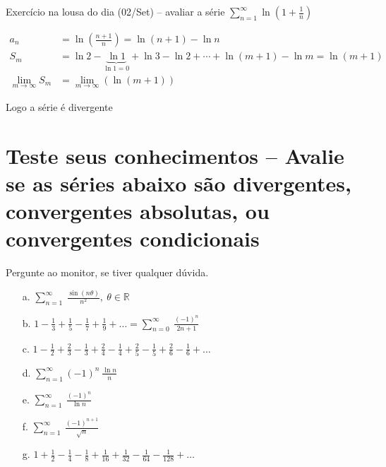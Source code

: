 \documentclass[12pt,openany, letterpaper]{book}
\newcommand{\LI}[1][n]{\lim_{{#1} \rightarrow \infty}}
\newcommand{\soma}[2][n]{\sum_{{#1} = #2}^\infty}
\begin{document}
Exercício na lousa do dia (02/Set) -- avaliar a série $\soma{1} \ln \left( 1 + \frac{1}{n}\right)$

\begin{align*}
a_n &= \ln \left( \frac{n+1}{n} \right) = \ln (n+1) - \ln n \\
S_m &= \ln 2 - \underbrace{\ln 1}_{\ln 1 = 0} + \ln 3 - \ln 2 + \cdots + \ln (m+1) - \ln m = \ln (m+1)\\
\LI[m] S_m &= \LI[m] (\ln (m+1))
\end{align*}

Logo a série é divergente

\section{Teste seus conhecimentos -- Avalie se as séries abaixo são divergentes, convergentes absolutas, ou convergentes condicionais} Pergunte ao monitor, se tiver qualquer dúvida.
\begin{itemize}
\item [a.] $\displaystyle{\sum_{n=1}^{\infty} \ \frac{\sin(n\theta)}{n^2}, \ \theta \in \mathds{R}}$
\item [b.] $\displaystyle{1-\frac{1}{3}+\frac{1}{5}-\frac{1}{7}+ \frac{1}{9} + \hdots = \sum_{n=0}^{\infty} \ \frac{(-1)^n}{2n+1}}$
\item [c.] $\displaystyle{1-\frac{1}{2}+\frac{2}{3}-\frac{1}{3}+\frac{2}{4}-\frac{1}{4}+\frac{2}{5}-\frac{1}{5}+\frac{2}{6}}-\frac{1}{6}+ \hdots$
\item [d.] $\displaystyle{\sum_{n=1}^{\infty} (-1)^n \ \frac{\ln n}{n}}$
\item [e.] $\displaystyle{\sum_{n=1}^{\infty} \ \frac{(-1)^n}{\ln n}}$
\item [f.] $\displaystyle{\sum_{n=1}^{\infty} \ \frac{(-1)^{n+1}}{\sqrt{n}}}$
\item [g.] $\displaystyle{1+\frac{1}{2}-\frac{1}{4}-\frac{1}{8}+\frac{1}{16}+\frac{1}{32}-\frac{1}{64}-\frac{1}{128}+\hdots}$
\end{itemize}
\end{document}
